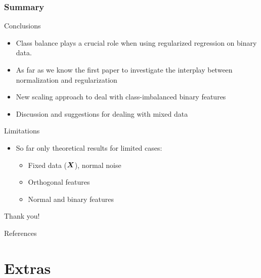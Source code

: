 \documentclass[aspectratio=1610,onlytextwidth]{beamer}
\begin{document}
\begin{frame}[c]
  \frametitle{Summary}
  \begin{exampleblock}{Conclusions}
    \begin{itemize}
      \item Class balance plays a crucial role when using regularized regression on binary data.
      \item As far as we know the first paper to investigate the interplay between normalization and
            regularization
      \item New scaling approach to deal with class-imbalanced binary features
      \item Discussion and suggestions for dealing with mixed data
    \end{itemize}
  \end{exampleblock}

  \pause

  \begin{alertblock}{Limitations}
    \begin{itemize}
      \item So far only theoretical results for limited cases:
            \begin{itemize}
              \item Fixed data (\(\boldsymbol{X}\)), normal noise
              \item Orthogonal features
              \item Normal and binary features
            \end{itemize}
    \end{itemize}
  \end{alertblock}
\end{frame}

\begin{frame}[standout]
  Thank you!
\end{frame}

\appendix

\begin{frame}[allowframebreaks]{References}
  \printbibliography[heading=none]
\end{frame}

\section{Extras}
\end{document}
